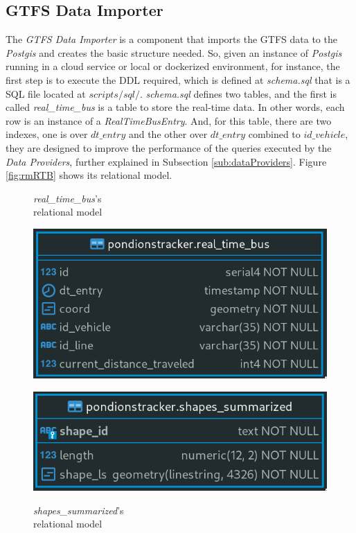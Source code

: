 \subsection{GTFS Data Importer}
The \textit{GTFS Data Importer} is a component that imports the GTFS data to the \textit{Postgis}
and creates the basic structure needed. So, given an instance of \textit{Postgis} running 
in a cloud service or local or dockerized environment, for instance, the first step is to 
execute the \ac{DDL} required, which is defined at \textit{schema.sql} that is a \ac{SQL} file 
located at $scripts/sql/$. 
\textit{schema.sql} defines two tables, and the first is called 
{\em  real\_time\_bus} is a table to store the real-time data. In other words, each row is
an instance of a \textit{RealTimeBusEntry}. And, for this table, there are two indexes,
one is over $dt\_entry$ and the other over $dt\_entry$ combined to $id\_vehicle$, 
they are designed to improve the performance of the queries executed by the \textit{Data Providers},
further explained in Subsection \ref{sub:dataProviders}. Figure \ref{fig:rmRTB} shows its relational model.

\begin{figure}[h]
\centering
\begin{minipage}[t]{.5\textwidth}
  \centering
  \caption{{\em  real\_time\_bus}'s \\relational model}
  \includegraphics[width=.99\linewidth]{imagem/cap4/real_time_bus_ER.png}
  \label{fig:rmRTB}
\end{minipage}%
\begin{minipage}[t]{.5\textwidth}
  \centering
  \caption{{\em  shapes\_summarized}'s \\relational model}
  \includegraphics[width=.99\linewidth]{imagem/cap4/shapes_summarized_ER.png}
  \label{fig:rmSS}
\end{minipage}
\end{figure}

